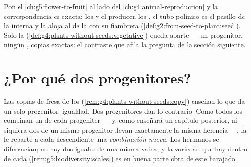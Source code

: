\begin{remark}\label{rem:g8:sexual-reproduction:plants}
Pon el \cref{ch:g5:flower-to-fruit} al lado del
\cref{ch:g4:animal-reproduction} y la correspondencia es exacta: los
 y el  producen los , el tubo polínico es el
pasillo de la  interna y la  aloja al  de la
 con su fiambrera (\cref{def:g2:from-seed-to-plant:seed}). Solo
la 
(\cref{def:g4:plants-without-seeds:vegetative}) queda aparte --- un
progenitor, ningún , copias exactas: el contraste que afila la
pregunta de la sección siguiente.
\end{remark}

\section{¿Por qué dos progenitores?}

\begin{proposition}\label{prop:g8:sexual-reproduction:shuffle}
Las copias de fresa de los 
(\cref{rem:g4:plants-without-seeds:copy}) enseñan lo que da un solo
progenitor: igualdad. Dos progenitores dan lo contrario. Como todos los
 combinan un  de cada progenitor --- y, como enseñará un
capítulo posterior, ni siquiera dos  de un mismo progenitor
llevan exactamente la misma herencia ---, la  le
reparte a cada descendiente una \emph{combinación nueva}. Los hermanos
se diferencian; no hay dos  iguales de una misma vaina; y la
variedad que hay dentro de cada 
(\cref{rem:g5:biodiversity:scales}) es en buena parte obra de este
barajado.
\end{proposition}
\admitted

